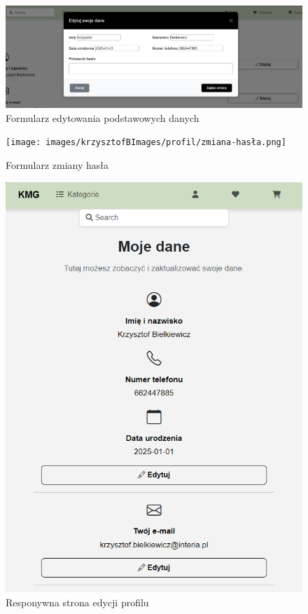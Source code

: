 \documentclass[12pt,a4paper,oneside]{article}
\theoremstyle{definition}
\numberwithin{equation}{section}
\begin{document}
\begin{figure}[H]
    \centering
    \includegraphics[width=0.9\columnwidth]{images/krzysztofBImages/profil/edycja-danych.png}
    \caption{Formularz edytowania podstawowych danych}
    \label{edycja-danych}
\end{figure}

\begin{figure}[H]
    \centering
    \texttt{[image: images/krzysztofBImages/profil/zmiana-hasła.png]}
    \caption{Formularz zmiany hasła}
    \label{zmiana-hasła}
\end{figure}

\begin{figure}[H]
    \centering
    \includegraphics[width=0.5\columnwidth]{images/krzysztofBImages/profil/responywna-strona-profilu.png}
    \caption{Responywna strona edycji profilu}
    \label{responywna-strona-profilu}
\end{figure}
\end{document}
